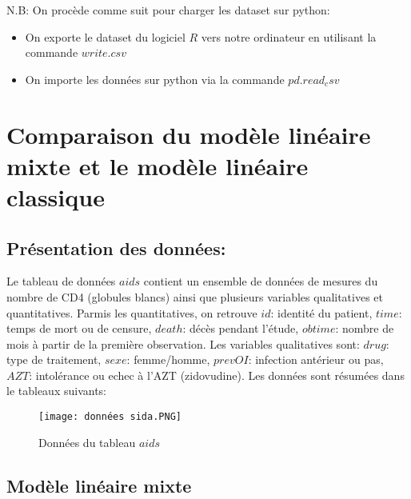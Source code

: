 \documentclass{article}
\begin{document}
\vspace{0.5cm}

N.B: On procède comme suit pour charger les dataset sur python: 
\begin{itemize}
    \item On exporte le dataset du logiciel $R$ vers notre ordinateur en utilisant la commande $write.csv$
    \item On importe les données sur python via la commande $pd.read_csv$
\end{itemize}

\newpage


\section{Comparaison du modèle linéaire mixte et le modèle linéaire classique}
\subsection{Présentation des données:}
Le tableau de données $aids$ contient un ensemble de données de mesures du nombre de CD4 (globules blancs) ainsi que plusieurs variables qualitatives et quantitatives. Parmis les quantitatives, on retrouve $id$: identité du patient, $time$: temps de mort ou de censure, $death$: décès pendant l'étude, $obtime$: nombre de mois à partir de la première observation. Les variables qualitatives sont: $drug$: type de traitement, $sexe$: femme/homme, $prevOI$: infection antérieur ou pas, $AZT$: intolérance ou echec à l'AZT (zidovudine). Les données sont résumées dans le tableaux suivants:

\begin{figure}[htbp]
    \centering
    \texttt{[image: données sida.PNG]}
    \caption{Données du tableau $aids$}
    \label{fig:my_label}
\end{figure}

 
\subsection{Modèle linéaire mixte}
\label{sec:pour_aller_plus_loin_sur_ce_theme}
\end{document}

